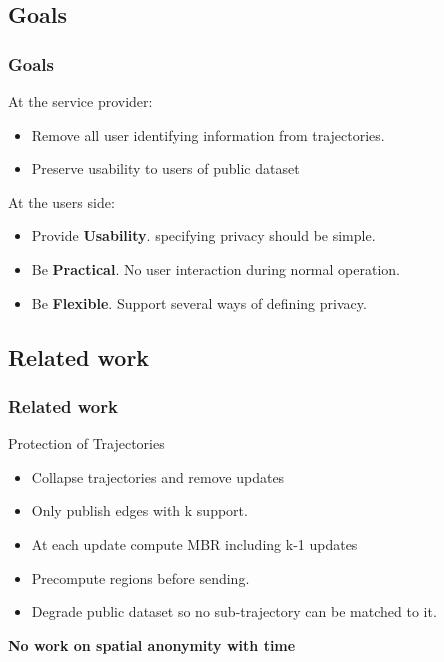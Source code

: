 \subsection{Goals} %

\begin{frame}[red] %
\frametitle{Goals}

At the service provider:
\begin{itemize}
\item Remove all user identifying information from trajectories.
\item Preserve usability to users of public dataset
\end{itemize}

\vspace{3em}
At the users side:\\

\begin{itemize}
\item  Provide {\bf Usability}. specifying privacy should be simple.
\item Be {\bf Practical}. No user interaction during normal operation.
\item Be {\bf Flexible}. Support several ways of defining privacy.
\end{itemize}

\end{frame}



\subsection{Related work}

\begin{frame}
\frametitle{Related work}

Protection of Trajectories
\begin{itemize}
\item Collapse trajectories and remove updates
\item Only publish edges with k support.
\vspace{1em}
\item At each update compute MBR including k-1 updates
\item Precompute regions before sending.
\vspace{1em}
\item Degrade public dataset so no sub-trajectory can be matched to it.
\end{itemize}
\vspace{1em}
{\Large \bf No work on spatial anonymity with time}
\end{frame}
